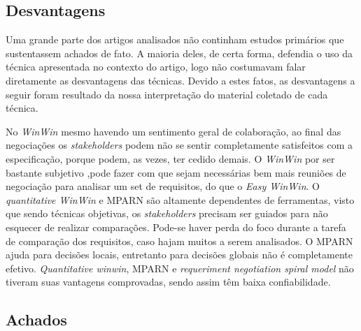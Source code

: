 \subsection{Desvantagens}

Uma grande parte dos artigos analisados não continham estudos primários que
sustentassem achados de fato. A maioria deles, de certa forma, defendia o uso da
técnica apresentada no contexto do artigo, logo não costumavam falar diretamente
as desvantagens das técnicas. Devido a estes fatos, as desvantagens a seguir
foram resultado da nossa interpretação do material coletado de cada técnica.

No \textit{WinWin} mesmo havendo um sentimento geral de colaboração, ao final
das negociações os \textit{stakeholders} podem não se sentir completamente
satisfeitos com a especificação, porque podem, as vezes, ter cedido demais.
O \textit{WinWin} por ser bastante subjetivo \cite{ruhe2002software},pode fazer
com que sejam necessárias bem mais reuniões de negociação para analisar um set
de requisitos, do que o \textit{Easy WinWin}.
O \textit{quantitative WinWin} e MPARN são altamente dependentes de ferramentas,
visto que sendo técnicas objetivas, os \textit{stakeholders} precisam ser
guiados para não esquecer de realizar comparações. Pode-se haver perda do foco durante a tarefa
de comparação dos requisitos, caso hajam muitos a serem analisados. O MPARN ajuda para decisões locais, entretanto para decisões globais não é completamente efetivo.
\textit{Quantitative winwin}, MPARN e \textit{requeriment negotiation spiral
model} não tiveram suas vantagens comprovadas, sendo assim têm baixa
confiabilidade. \cite{ruhe2002quantitative}\cite{in2004requirements}

\subsection{Achados}

